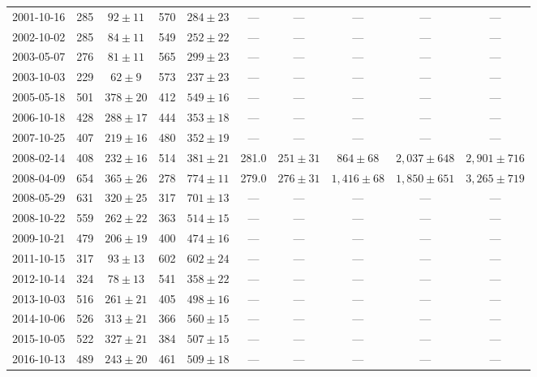 \begin{landscape}
\begin{longtable}{cccccccccc}
{2001-10-16} & 285 & {$92  \pm  11$} & 570 & {$284 \pm 23$} & --- & --- & --- & --- & --- \\
{2002-10-02} & 285 & {$84  \pm  11$} & 549 & {$252 \pm 22$} & --- & --- & --- & --- & --- \\
{2003-05-07} & 276 & {$81  \pm  11$} & 565 & {$299 \pm 23$} & --- & --- & --- & --- & --- \\
{2003-10-03} & 229 & {$62  \pm  9$} & 573 & {$237 \pm 23$} & --- & --- & --- & --- & --- \\
{2005-05-18} & 501 & {$378  \pm  20$} & 412 & {$549 \pm 16$} & --- & --- & --- & --- & --- \\
{2006-10-18} & 428 & {$288  \pm  17$} & 444 & {$353 \pm 18$} & --- & --- & --- & --- & --- \\
{2007-10-25} & 407 & {$219  \pm  16$} & 480 & {$352 \pm 19$} & --- & --- & --- & --- & --- \\
{2008-02-14} & 408 & {$232  \pm  16$} & 514 & {$381 \pm 21$} & 281.0 & {$251 \pm 31$} & {$864 \pm 68$} & {$2,037 \pm 648$} & {$2,901 \pm 716$} \\
{2008-04-09} & 654 & {$365  \pm  26$} & 278 & {$774 \pm 11$} & 279.0 & {$276 \pm 31$} & {$1,416 \pm 68$} & {$1,850 \pm 651$} & {$3,265 \pm 719$} \\
{2008-05-29} & 631 & {$320  \pm  25$} & 317 & {$701 \pm 13$} & --- & --- & --- & --- & --- \\
{2008-10-22} & 559 & {$262  \pm  22$} & 363 & {$514 \pm 15$} & --- & --- & --- & --- & --- \\
{2009-10-21} & 479 & {$206  \pm  19$} & 400 & {$474 \pm 16$} & --- & --- & --- & --- & --- \\
{2011-10-15} & 317 & {$93  \pm  13$} & 602 & {$602 \pm 24$} & --- & --- & --- & --- & --- \\
{2012-10-14} & 324 & {$78  \pm  13$} & 541 & {$358 \pm 22$} & --- & --- & --- & --- & --- \\
{2013-10-03} & 516 & {$261  \pm  21$} & 405 & {$498 \pm 16$} & --- & --- & --- & --- & --- \\
{2014-10-06} & 526 & {$313  \pm  21$} & 366 & {$560 \pm 15$} & --- & --- & --- & --- & --- \\
{2015-10-05} & 522 & {$327  \pm  21$} & 384 & {$507 \pm 15$} & --- & --- & --- & --- & --- \\
{2016-10-13} & 489 & {$243  \pm  20$} & 461 & {$509 \pm 18$} & --- & --- & --- & --- & --- \\
\end{longtable} 
\end{landscape} 
